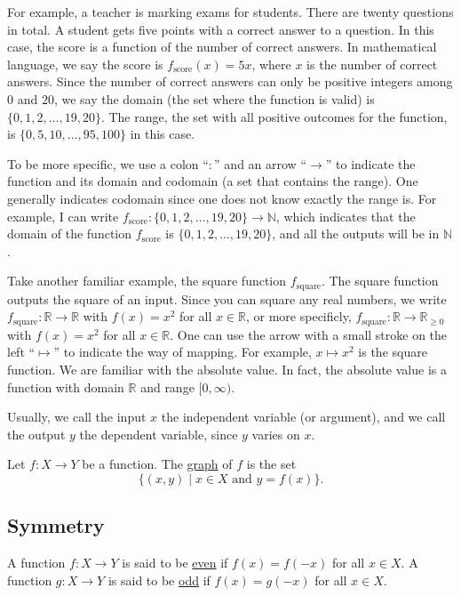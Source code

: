 \documentclass[11pt]{book}
\theoremstyle{break}
\theoremstyle{no_label}
\newcommand{\bbR}{\mathbb{R}}
\newcommand{\bbN}{\mathbb{N}}
\numberwithin{equation}{section}
\begin{document}
For example, a teacher is marking exams for students. There are twenty questions in total. A student gets five points with a correct answer to a question. In this case, the score is a function of the number of correct answers. In mathematical language, we say the score is $f_{\text{score}}(x)=5x$, where $x$ is the number of correct answers. Since the number of correct answers can only be positive integers among $0$ and $20$, we say the domain (the set where the function is valid) is $\{0, 1, 2, \dots, 19, 20\}$. The range, the set with all positive outcomes for the function, is $\{0, 5, 10, \dots, 95, 100\}$ in this case.

To be more specific, we use a colon ``$:$'' and an arrow ``$\to$'' to indicate the function and its domain and codomain (a set that contains the range). One generally indicates codomain since one does not know exactly the range is. For example, I can write $f_{\text{score}}:\{0, 1, 2, \dots, 19, 20\}\to\bbN$, which indicates that the domain of the function $f_{\text{score}}$ is $\{0, 1, 2, \dots, 19, 20\}$, and all the outputs will be in $\bbN$.

Take another familiar example, the square function $f_{\text{square}}$. The square function outputs the square of an input. Since you can square any real numbers, we write $f_{\text{square}}:\bbR\to\bbR$ with $f(x)=x^2$ for all $x\in\bbR$, or more specificly, $f_{\text{square}}:\bbR\to\bbR_{\geq0}$ with $f(x)=x^2$ for all $x\in\bbR$. One can use the arrow with a small stroke on the left ``$\mapsto$'' to indicate the way of mapping. For example, $x\mapsto x^2$ is the square function. We are familiar with the absolute value. In fact, the absolute value is a function with domain $\bbR$ and range $[0, \infty)$.

Usually, we call the input $x$ the independent variable (or argument), and we call the output $y$ the dependent variable, since $y$ varies on $x$.

\begin{definition}[Graph]
    Let $f:X\to Y$ be a function. The \underline{graph} of $f$ is the set $$\{(x, y)\mid x\in X\text{ and }y=f(x)\}.$$
\end{definition}

\subsection*{Symmetry}

\begin{definition}
    A function $f:X\to Y$ is said to be \underline{even} if $f(x)=f(-x)$ for all $x\in X$. A function $g:X\to Y$ is said to be \underline{odd} if $f(x)=g(-x)$ for all $x\in X$.
\end{definition}
\end{document}
